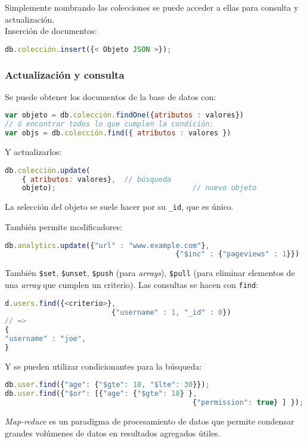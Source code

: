 Simplemente nombrando las colecciones se puede acceder a ellas para consulta y actualización.\\
Inserción de documentos:
\begin{lstlisting}[language=JavaScript]
db.colección.insert({< Objeto JSON >});
\end{lstlisting}
\subsubsection{Actualización y consulta}
Se puede obtener los documentos de la base de datos con:
\begin{lstlisting}[language=JavaScript]
var objeto = db.colección.findOne({atributos : valores})
// ó encontrar todos lo que cumplen la condición:
var objs = db.colección.find({ atributos : valores })
\end{lstlisting}
Y actualizarlos:
\begin{lstlisting}[language=JavaScript]
db.colección.update(
	{ atributos: valores}, 	// búsqueda
	objeto);								// nuevo objeto
\end{lstlisting}
La selección del objeto se suele hacer por su \texttt{_id}, que es único.

También permite modificadores:
\begin{lstlisting}[language=JavaScript]
db.analytics.update({"url" : "www.example.com"},
										{"$inc" : {"pageviews" : 1}})
\end{lstlisting}
También \texttt{\$set}, \texttt{\$unset}, \texttt{\$push} (para \textit{arrays}), \texttt{\$pull} (para eliminar elementos de una \textit{array} que cumplen un criterio).
Las consultas se hacen con \texttt{find}:
\begin{lstlisting}[language=JavaScript]
d.users.find({<criterio>},
						 {"username" : 1, "_id" : 0})
// =>
{
"username" : "joe",
}
\end{lstlisting}
Y se pueden utilizar condicionantes para la búsqueda:
\begin{lstlisting}[language = JavaScript]
db.user.find({"age": {"$gte": 18, "$lte": 30}});
db.user.find({"$or": [{"age": {"$gte": 18} },
											{"permission": true} ] });
\end{lstlisting}
\textit{Map-reduce} es un paradigma de procesamiento de datos que permite condensar grandes volúmenes de datos en resultados agregados útiles.

